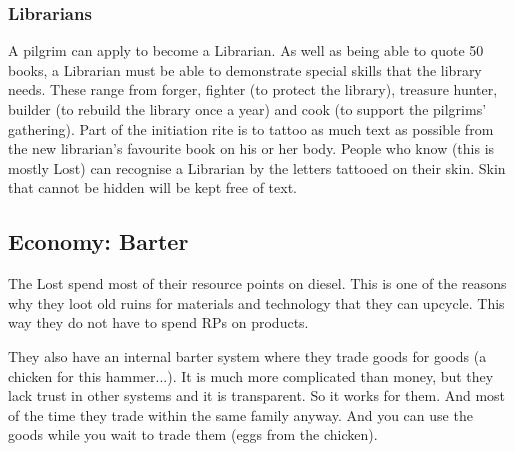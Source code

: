 \subsubsection{Librarians}

A pilgrim can apply to become a Librarian. As well as being able to quote 50 books, a Librarian must be able to demonstrate special skills that the library needs. These range from forger, fighter (to protect the library), treasure hunter, builder (to rebuild the library once a year) and cook (to support the pilgrims' gathering).
Part of the initiation rite is to tattoo as much text as possible from the new librarian's favourite book on his or her body. People who know (this is mostly Lost) can recognise a Librarian by the letters tattooed on their skin.
Skin that cannot be hidden will be kept free of text.

\subsection{Economy: Barter}
\label{sec:Barter}
The Lost spend most of their resource points on diesel. This is one of the reasons why they loot old ruins for materials and technology that they can upcycle. This way they do not have to spend RPs on products.

They also have an internal barter system where they trade goods for goods (a chicken for this hammer...).
It is much more complicated than money, but they lack trust in other systems and it is transparent. So it works for them. And most of the time they trade within the same family anyway.
And you can use the goods while you wait to trade them (eggs from the chicken).



